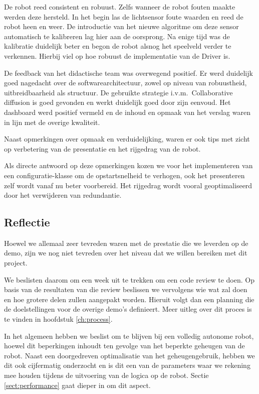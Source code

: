 \documentclass[12pt,a4paper]{report}
\begin{document}
De robot reed consistent en robuust. Zelfs wanneer de robot fouten maakte werden deze hersteld. In het begin las de lichtsensor foute waarden en reed de robot heen en weer. De introductie van het nieuwe algoritme om deze sensor automatisch te kalibreren lag hier aan de oorsprong. Na enige tijd was de kalibratie duidelijk beter en begon de robot alsnog het speelveld verder te verkennen. Hierbij viel op hoe robuust de implementatie van de Driver is.

De feedback van het didactische team was overwegend positief. Er werd duidelijk goed nagedacht over de softwarearchitectuur, zowel op niveau van robuustheid, uitbreidbaarheid als structuur. De gebruikte strategie i.v.m.\ Collaborative diffusion is goed gevonden en werkt duidelijk goed door zijn eenvoud. Het dashboard werd positief vermeld en de inhoud en opmaak van het verslag waren in lijn met de overige kwaliteit.

Naast opmerkingen over opmaak en verduidelijking, waren er ook tips met zicht op verbetering van de presentatie en het rijgedrag van de robot.

Als directe antwoord op deze opmerkingen kozen we voor het implementeren van een configuratie-klasse om de opstartsnelheid te verhogen, ook het presenteren zelf wordt vanaf nu beter voorbereid. Het rijgedrag wordt vooral geoptimaliseerd door het verwijderen van redundantie.

\subsection{Reflectie}

Hoewel we allemaal zeer tevreden waren met de prestatie die we leverden op de demo, zijn we nog niet tevreden over het niveau dat we willen bereiken met dit project.

We beslisten daarom om een week uit te trekken om een code review te doen. Op basis van de resultaten van die review beslissen we vervolgens wie wat zal doen en hoe grotere delen zullen aangepakt worden. Hieruit volgt dan een planning die de doelstellingen voor de overige demo's definieert. Meer uitleg over dit proces is te vinden in hoofdstuk \ref{ch:process}.

In het algemeen hebben we beslist om te blijven bij een volledig autonome robot, hoewel dit beperkingen inhoudt ten gevolge van het beperkte geheugen van de robot. Naast een doorgedreven optimalisatie van het geheugengebruik, hebben we dit ook cijfermatig onderzocht en is dit een van de parameters waar we rekening mee houden tijdens de uitvoering van de logica op de robot. Sectie \ref{sect:performance} gaat dieper in om dit aspect.
\end{document}
